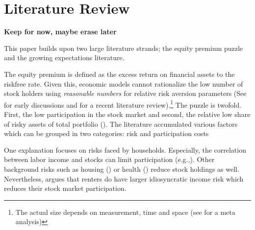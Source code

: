 \documentclass[ProjectABM]{subfiles}
\begin{document}

\section{Literature Review}\label{sec:literature}
\textbf{Keep for now, maybe erase later}

This paper builds upon two large literature strands; the equity premium puzzle and the growing expectations literature.

The equity premium is defined as the excess return on financial assets to the riskfree rate. Given this, economic models cannot rationalize the low number of stock holders using \textit{reasonable numbers} for relative risk aversion parameters (See \cite{mehra_porescott_1985equity_premium, haliassos_bertraut_1995equity_premium} for early discussions and \cite{Gomes_et_al_2021} for a recent literature review).\footnote{ The actual size depends on measurement, time and space (see\cite{vanEwijk_et_al_2012meta_equity_premium} for a meta analysis)} The puzzle is twofold. First, the low participation in the stock market and second, the relative low share of risky assets of total portfolio (\cite{campbell_2006household_finance}). The literature accumulated various factors which can be grouped in two categories: risk and participation costs %

One explanation focuses on risks faced by households. Especially, the correlation between labor income and stocks can limit participation (e.g.,\cite{BCG2007stocklabor}). Other background risks such as housing (\cite{cocco2005housing}) or health (\cite{GJT1996_health}) reduce stock holdings as well. Nevertheless, \cite{catherine2020_countercyclical} argues that renters do have larger idiosyncratic income risk which reduces their stock market participation.%
\end{document}
